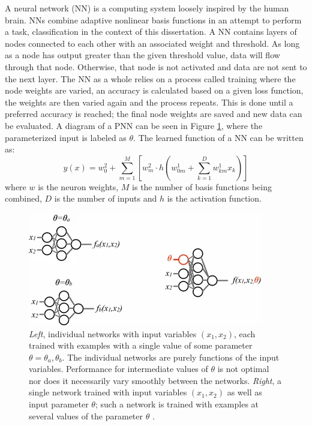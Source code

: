 		A neural network (NN) is a computing system loosely inspired by the human brain. NNs combine adaptive nonlinear basis functions in an attempt to perform a task, classification in the context of this dissertation. A NN contains layers of nodes connected to each other with an associated weight and threshold. As long as a node has output greater than the given threshold value, data will flow through that node. Otherwise, that node is not activated and data are not sent to the next layer. The NN as a whole relies on a process called training where the node weights are varied, an accuracy is calculated based on a given loss function, the weights are then varied again and the process repeats. This is done until a preferred accuracy is reached; the final node weights are saved and new data can be evaluated. A diagram of a PNN can be seen in Figure \ref{fig:PNN-diagram}, where the parameterized input is labeled as $\theta$. The learned function of a NN can be written as:
		\begin{equation}
		y(x) = w_{0}^{2} + \sum^{M}_{m=1}[ w^{2}_{m} \cdot h (w_{0m}^{1} + \sum^{D}_{k=1} w^{1}_{km} x_{k}  )]
		\end{equation}
		where $w$ is the neuron weights, $M$ is the number of basis functions being combined, $D$ is the number of inputs and $h$ is the activation function.

		\begin{figure}	
			\begin{center}
				\includegraphics[width=.6\textwidth,keepaspectratio=true]{chapters/chapter6_HPlus/images/PNN_Diagram.png}
			\end{center}
			\caption{\textit{Left}, individual networks with input variables $(x_{1},x_{2})$, each trained with examples with a single value of some parameter $\theta = \theta_{a}, \theta_{b}$. The individual networks are purely functions of the input variables. Performance for intermediate values of $\theta$ is not optimal nor does it necessarily vary smoothly between the networks. \textit{Right}, a single network trained with input variables $(x_{1},x_{2})$ as well as input parameter $\theta$; such a network is trained with examples at several values of the parameter $\theta$ \cite{PNN}.}
			\label{fig:PNN-diagram}
		\end{figure}	

